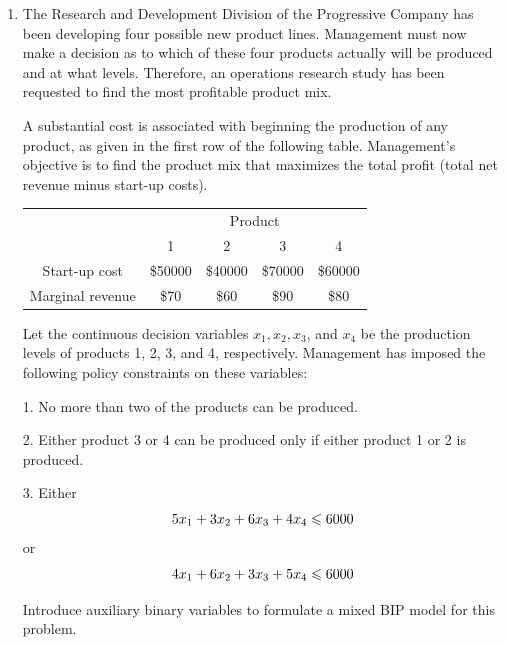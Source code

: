 \documentclass[a4paper]{article}
\begin{document}
\courseheader
{}

\begin{enumerate}
  \setlength{\itemsep}{3\parskip}

  \item The Research and Development Division of the Progressive Company has been developing four possible new product lines. Management must now make a decision as to which of these four products actually will be produced and at what levels. Therefore, an operations research study has been requested to find the most profitable product mix.
  
  \hspace*{4ex}A substantial cost is associated with beginning the production of any product, as given in the first row of the following table. Management's objective is to find the product mix that maximizes the total profit (total net revenue minus start-up costs).
\begin{table}[h]
	\centering
	\begin{tabular}{ccccc}
		\toprule[1.5pt]
		&\multicolumn{4}{c}{Product}\\
		\cmidrule{2-5}
		&1&2&3&4\\
		\midrule
		Start-up cost&\$50000& \$40000& \$70000&\$60000\\
	    Marginal revenue&\$70& \$60& \$90&\$80\\
		\bottomrule[1.5pt]
	\end{tabular}
\end{table}

\hspace*{4ex}Let the continuous decision variables $x_1, x_2, x_3$, and $x_4$ be the production levels of products 1, 2, 3, and 4, respectively. Management has imposed the following policy constraints on these variables:

1. No more than two of the products can be produced.

2. Either product 3 or 4 can be produced only if either product 1 or 2 is produced.

3. Either $$5x_1+3x_2+6x_3+4x_4\leqslant 6000$$ or $$4x_1+6x_2+3x_3+5x_4\leqslant 6000$$

\hspace*{4ex}Introduce auxiliary binary variables to formulate a mixed BIP model for this problem.

\begin{solution}
	

\end{solution}
\end{enumerate}
\end{document}
